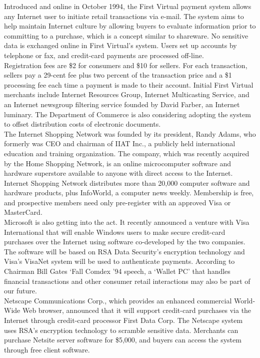 Introduced and online in October 1994, the First Virtual payment system
allows any Internet user to initiate retail transactions via e-mail.
The system aims to help maintain Internet culture by allowing buyers to
evaluate information prior to committing to a purchase, which is a
concept similar to shareware. No sensitive data is exchanged online in
First Virtual's system. Users set up accounts by telephone or fax, and
credit-card payments are processed off-line.\\

Registration fees are \$2 for consumers and \$10 for sellers. For each
transaction, sellers pay a 29-cent fee plus two percent of the
transaction price and a \$1 processing fee each time a payment is made
to their account. Initial First Virtual merchants include Internet
Resources Group, Internet Multicasting Service, and an Internet
newsgroup filtering service founded by David Farber, an Internet
luminary. The Department of Commerce is also considering adopting the
system to offset distribution costs of electronic documents.\\

The Internet Shopping Network was founded by its president, Randy
Adams, who formerly was CEO and chairman of IIAT Inc., a publicly held
international education and training organization. The company, which
was recently acquired by the Home Shopping Network, is an online
microcomputer software and hardware superstore available to anyone with
direct access to the Internet. Internet Shopping Network distributes
more than 20,000 computer software and hardware products, plus
InfoWorld, a computer news weekly. Membership is free, and prospective
members need only pre-register with an approved Visa or MasterCard.\\

Microsoft is also getting into the act. It recently announced a venture
with Visa International that will enable Windows users to make secure
credit-card purchases over the Internet using software co-developed by
the two companies. The software will be based on RSA Data Security's
encryption technology and Visa's VisaNet system will be used to
authenticate payments. According to Chairman Bill Gates `Fall Comdex
'94 speech, a `Wallet PC' that handles financial transactions and other
consumer retail interactions may also be part of our future.\\

Netscape Communications Corp., which provides an enhanced commercial
World-Wide Web browser, announced that it will support credit-card
purchases via the Internet through credit-card processor First Data
Corp. The Netscape system uses RSA's encryption technology to scramble
sensitive data. Merchants can purchase Netsite server software for
\$5,000, and buyers can access the system through free client software.\\

